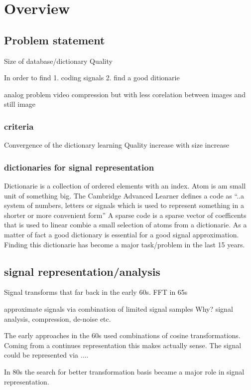 \chapter{Overview}

\section{Problem statement}
Size of database/dictionary
Quality

In order to find 
1. coding signals 
2. find a good ditionarie

analog problem video compression but with less corelation between images and still image 

\subsection{criteria}
Convergence of the dictionary learning
Quality increase with size increase 

\subsection{dictionaries for signal representation}
Dictionarie is a collection of ordered elements with an index.
Atom is am small unit of something big.
The Cambridge Advanced Learner defines a code as ``..a system of numbers, letters or signals which is used to represent something in a shorter or more convenient form''
A sparse code is a sparse vector of coefficents that is used to linear combie a small selection of atoms from a dictionarie.
As a matter of fact a good dictionary is essential for a good signal approximation. \cite{} Finding this dictionarie has become a major task/problem in the last 15 years.

\section{signal representation/analysis}
Signal transforms \cite{sparse intro} that far back in the early 60s.
FFT in 65s

approximate signals via combination of limited signal samples
Why?
signal analysis, compression, de-noise etc.

The early approaches in the 60s used combinations of cosine transformations. Coming from a continues representation this makes 
actually sense. The signal could be represented via ....

In 80s the search for better transformation basis became a major role in signal representation. \cite{}

